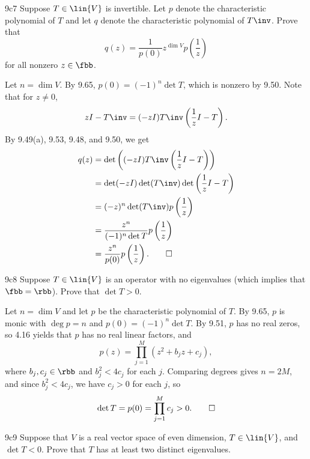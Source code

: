\begin{exercise}{9c7}
    Suppose $T \in \lin{V}$ is invertible.
    Let $p$ denote the characteristic polynomial of $T$ and let $q$ denote the characteristic polynomial of $T\inv$.
    Prove that
    \[
        q(z) = \frac{1}{p(0)} z^{\dim V} p\left(\frac{1}{z}\right)
    \]
    for all nonzero $z \in \fbb$.
\end{exercise}

\begin{sol}
    Let $n = \dim V$.
    By 9.65, $p(0) = (-1)^n \det T$, which is nonzero by 9.50.
    Note that for $z \neq 0$,
    \[
        z I - T\inv = (-z I)T\inv \left(\frac{1}{z} I - T\right).
    \]
    By 9.49(a), 9.53, 9.48, and 9.50, we get
    \begin{align*}
        q(z) &= \det\left((-z I) T\inv \left(\frac{1}{z} I - T\right)\right) \\
             &= \det(-z I) \det(T\inv) \det\left(\frac{1}{z} I - T\right) \\
             &= (-z)^n \det(T\inv) p\left(\frac{1}{z}\right) \\
             &= \frac{z^n}{(-1)^n \det T} p\left(\frac{1}{z}\right) \\
             &= \frac{z^n}{p(0)} p\left(\frac{1}{z}\right). \qedhere
    \end{align*}
\end{sol}

\begin{exercise}{9c8}
    Suppose $T \in \lin{V}$ is an operator with no eigenvalues (which implies that $\fbb = \rbb$).
    Prove that $\det T > 0$.
\end{exercise}

\begin{sol}
    Let $n = \dim V$ and let $p$ be the characteristic polynomial of $T$.
    By 9.65, $p$ is monic with $\deg p = n$ and $p(0) = (-1)^n \det T$.
    By 9.51, $p$ has no real zeros, so 4.16 yields that $p$ has no real linear factors, and
    \[
        p(z) = \prod_{j=1}^M (z^2 + b_j z + c_j),
    \]
    where $b_j, c_j \in \rbb$ and $b_j^2 < 4c_j$ for each $j$.
    Comparing degrees gives $n = 2M$, and since $b_j^2 < 4c_j$, we have $c_j > 0$ for each $j$, so
    \[
        \det T = p(0) = \prod_{j=1}^M c_j > 0. \qedhere
    \]
\end{sol}

\begin{exercise}{9c9}
    Suppose that $V$ is a real vector space of even dimension, $T \in \lin{V}$, and $\det T < 0$.
    Prove that $T$ has at least two distinct eigenvalues.
\end{exercise}

